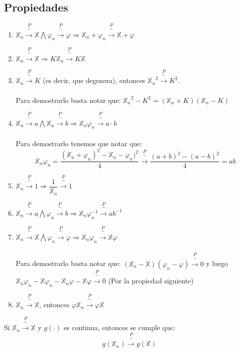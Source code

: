 \documentclass[12pt,a4paper]{book}
\begin{document}
\subsection{Propiedades}
\begin{enumerate}
\item $\mathbb{X}_n\overbrace{\longrightarrow}^P \mathbb{X} \bigwedge \varphi_n\overbrace{\longrightarrow}^P \varphi \Longrightarrow \mathbb{X}_n + \varphi_n\overbrace{\longrightarrow}^P\mathbb{X}+\varphi$
\item $\mathbb{X}_n\overbrace{\longrightarrow}^P \mathbb{X}\Longrightarrow K\mathbb{X}_n\overbrace{\longrightarrow}^P K\mathbb{X}$
\item $\mathbb{X}_n\overbrace{\longrightarrow}^P K$ (es decir, que degenera), entonces ${\mathbb{X}_n}^2\overbrace{\longrightarrow}^P K^2$.\\\\
Para demostrarlo basta notar que: ${\mathbb{X}_n}^2-K^2=(\mathbb{X}_n + K)(\mathbb{X}_n -K)$
\item $\mathbb{X}_n\overbrace{\longrightarrow}^P a \bigwedge \mathbb{X}_n\overbrace{\longrightarrow}^P b\Longrightarrow \mathbb{X}_n \mathbb{\varphi}_n \overbrace{\longrightarrow}^P a\cdot b$
\\\\
Para demostrarlo tenemos que notar que: 
$$\mathbb{X}_n\varphi_n=\dfrac{(\mathbb{X}_n + \varphi_n)^2-\mathbb{X}_n - \varphi_n)^2}{4}\overbrace{\longrightarrow}^P \dfrac{(a+b)^2-(a-b)^2}{4}=ab$$
\item $\mathbb{X}_n\overbrace{\longrightarrow}^P 1 \Longrightarrow \dfrac{1}{\mathbb{X}_n}\overbrace{\longrightarrow}^P 1$
\item $\mathbb{X}_n\overbrace{\longrightarrow}^P a \bigwedge \varphi_n\overbrace{\longrightarrow}^P b\Longrightarrow \mathbb{X}_n\varphi_n^{-1}\overbrace{\longrightarrow}^P ab^{-1}$
\item $\mathbb{X}_n\overbrace{\longrightarrow}^P \mathbb{X}\bigwedge \varphi_n\overbrace{\longrightarrow}^P \varphi \Longrightarrow\mathbb{X}_n\varphi_n\overbrace{\longrightarrow}^P\mathbb{X}\varphi$
\\\\
Para demostrarlo basta notar que: $(\mathbb{X}_n - \mathbb{X})(\varphi_n - \varphi)\overbrace{\longrightarrow}^P 0$ y luego $\mathbb{X}_n\varphi_n-\mathbb{X}\varphi_n-\mathbb{X}_n\varphi-\mathbb{X}\varphi\overbrace{\longrightarrow}^P 0$ (Por la propiedad siguiente)
\item $\mathbb{X}_n\overbrace{\longrightarrow}^P \mathbb{X}$, entonces $\varphi\mathbb{X}_n\overbrace{\longrightarrow}^P \varphi\mathbb{X}$
\end{enumerate}
\begin{theorem}
Si $\mathbb{X}_n\overbrace{\longrightarrow}^P \mathbb{X}$ y $g(\cdot)$ es continua, entonces se cumple que:
$$g(\mathbb{X}_n)\overbrace{\longrightarrow}^P g(\mathbb{X})$$
\end{theorem}
\end{document}
